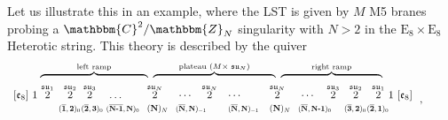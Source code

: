 \documentclass[11pt]{article}
\numberwithin{equation}{section}
\begin{document}
Let us illustrate this in an example, where the LST is given by $M$ M5 branes probing a $\mathbbm{C}^{2}/\mathbbm{Z}_{N}$ singularity with $N>2$ in the $\text{E}_8 \times \text{E}_8$ Heterotic string. This theory is described by the quiver 
\begin{align}
\label{ABJex} 
\begin{split}
~~~~~~~\overbrace{~\hspace{3.4cm}}^{\text{left ramp}}~\overbrace{\hspace{4.0cm}}^{\text{plateau }(M\times\;\mathfrak{su}_{N})}~\overbrace{~\hspace{3.2cm}}^{\text{right ramp}}~\hspace{2.2cm}\\[-2pt]
\begin{array}{lllllllllllllllllllllll}
 \lbrack  \mathfrak{e}_{8}\rbrack  \, \, 
1 \, 
\,  {\overset{\mathfrak{su}_{1}}{2}}   
& &  \hspace{-0.4cm} {\overset{\mathfrak{su}_2}{2}}& & \hspace{-0.5cm} 
{\overset{\mathfrak{su}_3}{2}} &    \ldots  
&   {\overset{\mathfrak{su}_{N}}{2}}&  \cdots    
&  \hspace{-0.4cm}  {\overset{\mathfrak{su}_{N}}{2}}  & \cdots &  {\overset{\mathfrak{su}_{N}}{2}} &  \cdots 
& \hspace{-0.4cm} {\overset{\mathfrak{su}_3}{2}}&
& \hspace{-0.4cm}  {\overset{\mathfrak{su}_{2}}{2}}  && \hspace{-0.4cm} 
{\overset{\mathfrak{su}_{1}}{2}}   \, \,  1 \, \, 
\lbrack \mathfrak{e}_{8} \rbrack      \\   
  & \hspace{-0.2cm}\scaleto{{(\overline{\textbf{1}},\textbf{2})_{0}}}{8pt} \hspace{-0.5cm}&&\hspace{-0.2cm}\scaleto{{(\overline{\textbf{2}},\textbf{3})_{0}}}{8pt}\hspace{-0.5cm}    & &\hspace{-0.1cm}\scaleto{{(\overline{\textbf{N-1}},\textbf{N})_{0}}}{8pt}\hspace{-0.1cm} & \scaleto{{ (\textbf{N})_{N}}}{8pt}& \hspace{-0.1cm}\scaleto{{(\overline{\textbf{N}},\textbf{N})_{-1}}}{8pt}\hspace{-0.1cm}&&\scaleto{{(\overline{\textbf{N}},\textbf{N})_{-1}}}{8pt}&\scaleto{{ (\textbf{N})_{N}}}{8pt}&\hspace{-0.1cm}\scaleto{{(\overline{\textbf{N}},\textbf{N-1})_{0}}}{8pt}\hspace{-0.1cm}&&\hspace{-0.2cm}\scaleto{{(\overline{\textbf{3}},\textbf{2})_{0}}}{8pt}\hspace{-0.5cm}&&\hspace{-0.2cm}\scaleto{{(\overline{\textbf{2}},\textbf{1})_{0}}}{8pt}\hspace{-0.5cm}& 
\end{array}\,,\hspace{1cm}
\end{split}
\end{align} 
\end{document}
